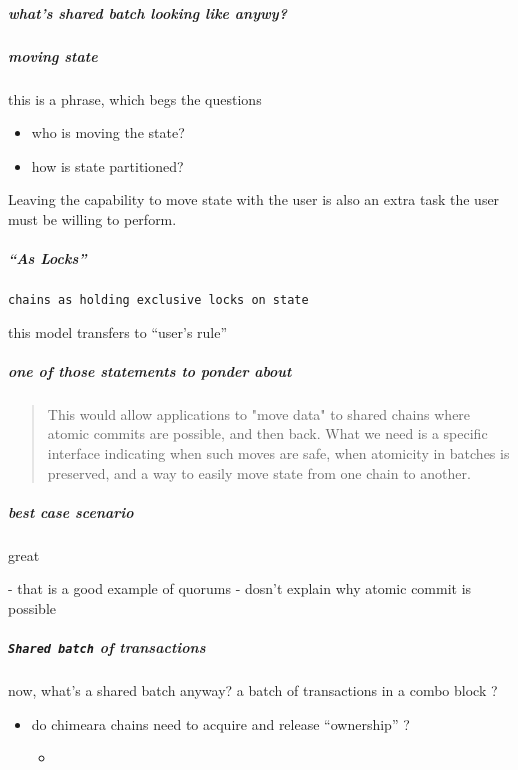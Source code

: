 \documentclass{article}
\theoremstyle{definition}
\begin{document}
\subparagraph{what's shared batch looking like anywy?}

\subparagraph{moving state}
this is a phrase, 
which begs the questions
\begin{itemize}
\item who is moving the state?
\item how is state partitioned?
\end{itemize}

Leaving the capability to move state with the user
is also an extra task the user must be willing to perform. 

\subparagraph{“As Locks”}

\texttt{chains as holding exclusive locks on state}

this model transfers to “user's rule”





\subparagraph{one of those statements to ponder about}

\begin{quote}
  This would allow applications to "move data" to shared chains where atomic commits are possible, and then back. What we need is a specific interface indicating when such moves are safe, when atomicity in batches is preserved, and a way to easily move state from one chain to another.
\end{quote}





\subparagraph{best case scenario}
great
\begin{markdown}
  - that is a good example of quorums
  - dosn't explain why atomic commit is possible
\end{markdown}
\subparagraph{\texttt{Shared batch} of transactions}
now,
what's a shared batch anyway?
a batch of transactions in a combo block ?




\begin{itemize}
\item 
  do chimeara chains need to acquire and release “ownership” ?

  \begin{itemize}
  \item 
  \end{itemize}

\end{itemize}
\end{document}
